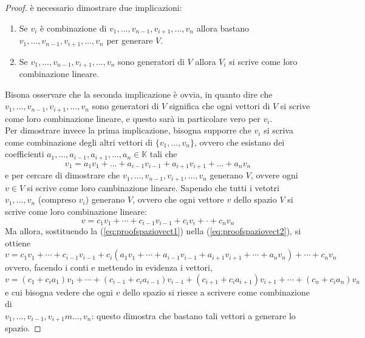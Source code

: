 \begin{proof}
  \label{proof:spaziovect1}
  è necessario dimostrare due implicazioni:
  \begin{enumerate}
  \item Se $v_i$ è combinazione di $v_1,\dots,v_{n-1}, v_{i+1},\dots,v_n$ allora bastano $v_1,\dots,v_{n-1}, v_{i+1},\dots,v_n$ per generare $V$.
  \item Se $v_1,\dots,v_{n-1}, v_{i+1},\dots,v_n$ sono generatori di $V$ allora $V_i$ si scrive come loro combinazione lineare.
  \end{enumerate}
  Bisona osservare che la seconda implicazione è ovvia, in quanto dire che $v_1,\dots,v_{n-1}, v_{i+1},\dots,v_n$ sono generatori di $V$ significa che ogni vettori di $V$ si scrive come loro combinazione lineare, e questo sarà in particolare vero per $v_i$.\\
  Per dimostrare invece la prima implicazione, bisogna supporre che $v_i$ si scriva come combinazione degli altri vettori di $\{v_1,\dots,v_n\}$, ovvero che esistano dei coefficienti $a_1,\dots,a_{i-1},a_{i+1},\dots,a_n\in \mathds{K}$ tali che
  \begin{equation}
    \label{eq:proofspaziovect1}
    v_1=a_1v_1+\dots+a_{i-1}v_{i-1}+a_{i+1}v_{i+1} +\dots+a_nv_n
  \end{equation}
  e per cercare di dimostrare che $v_1,\dots,v_{n-1}, v_{i+1},\dots,v_n$ generano $V$, ovvere ogni $v\in V$ si scrive come loro cambinazione lineare. Sapendo che tutti i vetotri $v_1,\dots,v_n$ (compreso $v_i$) generano $V$, ovvero che ogni vettore $v$ dello spazio $V$ si scrive come loro combinazione lineare:
  \begin{equation}
    \label{eq:proofspaziovect2}
    v=c_1v_1+\cdots+c_{i-1}v_{i-1}+c_iv_i+\cdot+c_nv_n
  \end{equation}
  Ma allora, sostituendo la (\ref{eq:proofspaziovect1}) nella (\ref{eq:proofspaziovect2}), si ottiene
  \begin{equation}
    \label{eq:proofspaziovect3}
    v=c_1v_1+\cdots+c_{i-1}v_{i-1}+c_i(a_1v_1+\cdots+a_{i-1}v_{i-1}+a_{i+1}v_{i+1} +\cdots+a_nv_n)+\cdots+c_nv_n
  \end{equation}
  ovvero, facendo i conti e mettendo in evidenza i vettori,
  \begin{equation}
    \label{eq:proofspaziovect4}
    v=(c_1+c_ia_1)v_1+\cdots + (c_{i-1}+c_ia_{i-1})v_{i-1}+(c_{i+1}+c_ia_{i+1})v_{i+1}+\cdots+(c_n+c_ia_n)v_n
  \end{equation}
  e cui bisogna vedere che ogni $v$ dello spazio si riesce a scrivere come combinazione di\\
  $v_1,\dots,v_{i-1},v_{i+1}m\dots,v_n$: questo dimostra che bastano tali vettori a generare lo spazio.
\end{proof}
